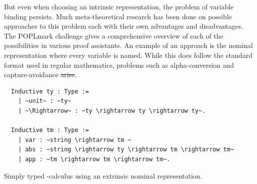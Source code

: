 \documentclass[11pt, final]{article} %
\providecommand{\DIFaddtex}[1]{{\protect\color{blue}\uwave{#1}}} %
\providecommand{\DIFdeltex}[1]{{\protect\color{red}\sout{#1}}}                      %
\providecommand{\DIFaddbegin}{} %
\providecommand{\DIFaddend}{} %
\providecommand{\DIFdelbegin}{} %
\providecommand{\DIFdelend}{} %
\providecommand{\DIFadd}[1]{\texorpdfstring{\DIFaddtex{#1}}{#1}} %
\providecommand{\DIFdel}[1]{\texorpdfstring{\DIFdeltex{#1}}{}} %
\newcommand{\DIFscaledelfig}{0.5}
\newlength{\DIFdelgraphicswidth} %
\newlength{\DIFdelgraphicsheight} %
\newcommand{\DIFaddincludegraphics}[2][]{{\color{blue}\fbox{\DIFOincludegraphics[#1]{#2}}}} %
\newcommand{\DIFdelincludegraphics}[2][]{%
\sbox{\DIFdelgraphicsbox}{\DIFOincludegraphics[#1]{#2}}%
\settoboxwidth{\DIFdelgraphicswidth}{\DIFdelgraphicsbox} %
\settoboxtotalheight{\DIFdelgraphicsheight}{\DIFdelgraphicsbox} %
\scalebox{\DIFscaledelfig}{%
\parbox[b]{\DIFdelgraphicswidth}{\usebox{\DIFdelgraphicsbox}\\[-\baselineskip] \rule{\DIFdelgraphicswidth}{0em}}\llap{\resizebox{\DIFdelgraphicswidth}{\DIFdelgraphicsheight}{%
\setlength{\unitlength}{\DIFdelgraphicswidth}%
\begin{picture}(1,1)%
\thicklines\linethickness{2pt} %
{\color[rgb]{1,0,0}\put(0,0){\framebox(1,1){}}}%
{\color[rgb]{1,0,0}\put(0,0){\line( 1,1){1}}}%
{\color[rgb]{1,0,0}\put(0,1){\line(1,-1){1}}}%
\end{picture}%
}\hspace*{3pt}}} %
} %
\DeclareRobustCommand{\DIFaddbegin}{\DIFOaddbegin \let\includegraphics\DIFaddincludegraphics} %
\DeclareRobustCommand{\DIFaddend}{\DIFOaddend \let\includegraphics\DIFOincludegraphics} %
\DeclareRobustCommand{\DIFdelbegin}{\DIFOdelbegin \let\includegraphics\DIFdelincludegraphics} %
\DeclareRobustCommand{\DIFdelend}{\DIFOaddend \let\includegraphics\DIFOincludegraphics} %
\begin{document}
But even when choosing an intrinsic representation, the problem of variable binding persists.
Much meta-theoretical research has been done on possible approaches to this problem each with their own advantages and disadvantages.
The POPLmark challenge gives a comprehensive overview of each of the possibilities in various proof assistants\cite{Aydemir2005}.
An example of an approach is the nominal representation where every variable is named.
While this does follow the standard format used in regular mathematics, problems such as alpha-conversion and capture-avoidance \DIFdelbegin \DIFdel{arise}\DIFdelend \DIFaddbegin \DIFadd{appears}\DIFaddend .

\begin{listing}[h]
  \begin{verbatim}
  Inductive ty : Type :=
    | ~unit~ : ~ty~
    | ~\Rightarrow~ : ~ty \rightarrow ty \rightarrow ty~.

  Inductive tm : Type :=
    | var : ~string \rightarrow tm ~
    | abs : ~string \rightarrow ty \rightarrow tm \rightarrow tm~
    | app : ~tm \rightarrow tm \rightarrow tm~.
  \end{verbatim}
  \caption{Simply typed \lambda-calculus using an extrinsic nominal representation.}
  \label{lst:nominal_stlc}
\end{listing}
\end{document}
